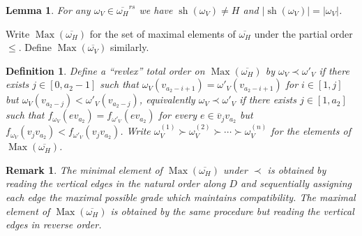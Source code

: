 \documentclass{amsart}
\newtheorem{definition}[theorem]{Definition}
\newtheorem{lemma}[theorem]{Lemma}
\newtheorem{remark}[theorem]{Remark}
\newcommand{\Max}{\operatorname{Max}}
\newcommand{\sh}{\operatorname{sh}}
\begin{document}
 \begin{lemma}\label{lem:shadow_magnitude}
  For any $\omega_V\in\overline{\omega_H}^{rs}$ we have $\sh(\omega_V)\ne H$ and $|\sh(\omega_V)|=|\omega_V|$.
 \end{lemma}

 Write $\Max(\overline{\omega_H})$ for the set of maximal elements of $\overline{\omega_H}$ under the partial order $\le$.  Define $\Max(\overline{\omega_V})$ similarly.
 \begin{definition}
  Define a ``revlex'' total order on $\Max(\overline{\omega_H})$ by $\omega_V\prec\omega'_V$ if there exists $j\in[0,a_2-1]$ such that $\omega_V(v_{a_2-i+1})=\omega'_V(v_{a_2-i+1})$ for $i\in[1,j]$ but $\omega_V(v_{a_2-j})<\omega'_V(v_{a_2-j})$, equivalently $\omega_V\prec\omega'_V$ if there exists $j\in[1,a_2]$ such that $f_{\omega_V}(ev_{a_2})=f_{\omega'_V}(ev_{a_2})$ for every $e\in\overline{v}_jv_{a_2}$ but $f_{\omega_V}(v_jv_{a_2})<f_{\omega'_V}(v_jv_{a_2})$.  Write $\omega_V^{(1)}\succ \omega_V^{(2)}\succ\cdots\succ \omega_V^{(n)}$ for the elements of $\Max(\overline{\omega_H})$.
 \end{definition}
 \begin{remark}
  The minimal element of $\Max(\overline{\omega_H})$ under $\prec$ is obtained by reading the vertical edges in the natural order along $D$ and sequentially assigning each edge the maximal possible grade which maintains compatibility.  The maximal element of $\Max(\overline{\omega_H})$ is obtained by the same procedure but reading the vertical edges in reverse order.
 \end{remark}
\end{document}
